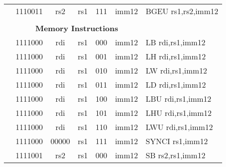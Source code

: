 \begin{table}[p]
\begin{small}
\begin{center}
\begin{tabular}{rcccccccccl}
&
\multicolumn{2}{|c|}{1110011} &
\multicolumn{1}{c|}{rs2} &
\multicolumn{1}{c|}{rs1} &
\multicolumn{1}{c|}{111} &
\multicolumn{4}{c|}{imm12} & BGEU rs1,rs2,imm12 \\
\cline{2-10}
  

&
\multicolumn{9}{c}{} & \\
&
\multicolumn{9}{c}{\bf Memory Instructions} & \\
\cline{2-10}
  

&
\multicolumn{2}{|c|}{1111000} &
\multicolumn{1}{c|}{rdi} &
\multicolumn{1}{c|}{rs1} &
\multicolumn{1}{c|}{000} &
\multicolumn{4}{c|}{imm12} & LB rdi,rs1,imm12 \\
\cline{2-10}
  

&
\multicolumn{2}{|c|}{1111000} &
\multicolumn{1}{c|}{rdi} &
\multicolumn{1}{c|}{rs1} &
\multicolumn{1}{c|}{001} &
\multicolumn{4}{c|}{imm12} & LH rdi,rs1,imm12 \\
\cline{2-10}
  

&
\multicolumn{2}{|c|}{1111000} &
\multicolumn{1}{c|}{rdi} &
\multicolumn{1}{c|}{rs1} &
\multicolumn{1}{c|}{010} &
\multicolumn{4}{c|}{imm12} & LW rdi,rs1,imm12 \\
\cline{2-10}
  

&
\multicolumn{2}{|c|}{1111000} &
\multicolumn{1}{c|}{rdi} &
\multicolumn{1}{c|}{rs1} &
\multicolumn{1}{c|}{011} &
\multicolumn{4}{c|}{imm12} & LD rdi,rs1,imm12 \\
\cline{2-10}
  

&
\multicolumn{2}{|c|}{1111000} &
\multicolumn{1}{c|}{rdi} &
\multicolumn{1}{c|}{rs1} &
\multicolumn{1}{c|}{100} &
\multicolumn{4}{c|}{imm12} & LBU rdi,rs1,imm12 \\
\cline{2-10}
  

&
\multicolumn{2}{|c|}{1111000} &
\multicolumn{1}{c|}{rdi} &
\multicolumn{1}{c|}{rs1} &
\multicolumn{1}{c|}{101} &
\multicolumn{4}{c|}{imm12} & LHU rdi,rs1,imm12 \\
\cline{2-10}
  

&
\multicolumn{2}{|c|}{1111000} &
\multicolumn{1}{c|}{rdi} &
\multicolumn{1}{c|}{rs1} &
\multicolumn{1}{c|}{110} &
\multicolumn{4}{c|}{imm12} & LWU rdi,rs1,imm12 \\
\cline{2-10}
  

&
\multicolumn{2}{|c|}{1111000} &
\multicolumn{1}{c|}{00000} &
\multicolumn{1}{c|}{rs1} &
\multicolumn{1}{c|}{111} &
\multicolumn{4}{c|}{imm12} & SYNCI rs1,imm12 \\
\cline{2-10}
  

&
\multicolumn{2}{|c|}{1111001} &
\multicolumn{1}{c|}{rs2} &
\multicolumn{1}{c|}{rs1} &
\multicolumn{1}{c|}{000} &
\multicolumn{4}{c|}{imm12} & SB rs2,rs1,imm12 \\
\cline{2-10}
  


\end{tabular}
\end{center}
\end{small}
\end{table}
